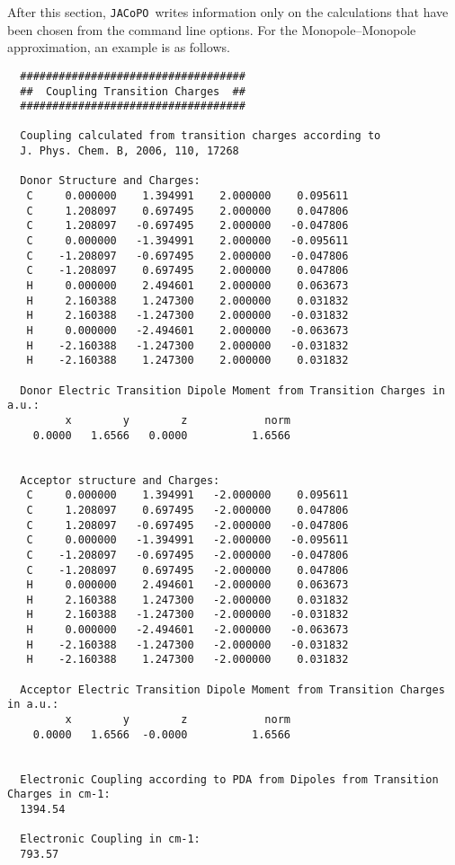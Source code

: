 \documentclass[a4paper]{article}
\newcommand{\jacopo}{\texttt{JACoPO}}
\begin{document}
After this section, \jacopo\ writes information only on the calculations that have been chosen from the command line options.
For the Monopole--Monopole approximation, an example is as follows.

\begin{verbatim}
  ###################################
  ##  Coupling Transition Charges  ##
  ###################################
  
  Coupling calculated from transition charges according to
  J. Phys. Chem. B, 2006, 110, 17268
  
  Donor Structure and Charges:
   C     0.000000    1.394991    2.000000    0.095611
   C     1.208097    0.697495    2.000000    0.047806
   C     1.208097   -0.697495    2.000000   -0.047806
   C     0.000000   -1.394991    2.000000   -0.095611
   C    -1.208097   -0.697495    2.000000   -0.047806
   C    -1.208097    0.697495    2.000000    0.047806
   H     0.000000    2.494601    2.000000    0.063673
   H     2.160388    1.247300    2.000000    0.031832
   H     2.160388   -1.247300    2.000000   -0.031832
   H     0.000000   -2.494601    2.000000   -0.063673
   H    -2.160388   -1.247300    2.000000   -0.031832
   H    -2.160388    1.247300    2.000000    0.031832
  
  Donor Electric Transition Dipole Moment from Transition Charges in a.u.:
         x        y        z            norm
    0.0000   1.6566   0.0000          1.6566
  
  
  Acceptor structure and Charges:
   C     0.000000    1.394991   -2.000000    0.095611
   C     1.208097    0.697495   -2.000000    0.047806
   C     1.208097   -0.697495   -2.000000   -0.047806
   C     0.000000   -1.394991   -2.000000   -0.095611
   C    -1.208097   -0.697495   -2.000000   -0.047806
   C    -1.208097    0.697495   -2.000000    0.047806
   H     0.000000    2.494601   -2.000000    0.063673
   H     2.160388    1.247300   -2.000000    0.031832
   H     2.160388   -1.247300   -2.000000   -0.031832
   H     0.000000   -2.494601   -2.000000   -0.063673
   H    -2.160388   -1.247300   -2.000000   -0.031832
   H    -2.160388    1.247300   -2.000000    0.031832
  
  Acceptor Electric Transition Dipole Moment from Transition Charges in a.u.:
         x        y        z            norm
    0.0000   1.6566  -0.0000          1.6566
  
  
  Electronic Coupling according to PDA from Dipoles from Transition Charges in cm-1:
  1394.54   
  
  Electronic Coupling in cm-1:
  793.57 
\end{verbatim}
\end{document}

